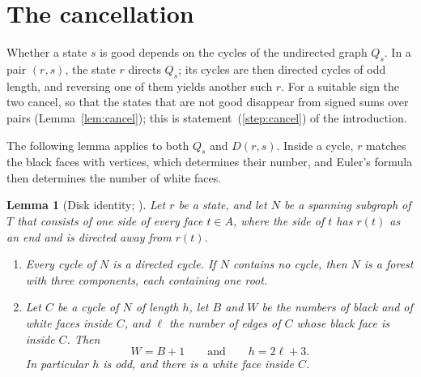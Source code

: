 \documentclass[a4paper]{amsart}
\numberwithin{equation}{section}
\newtheorem{lemma}[equation]{Lemma}
\theoremstyle{definition}
\begin{document}
\section{The cancellation}\label{sec:cancel}

Whether a state $s$ is good depends on the cycles of the undirected graph $Q_s$.
In a pair $(r,s)$, the state $r$ directs $Q_s$; its cycles are then directed cycles of odd length, and reversing one of them yields another such $r$.
For a suitable sign the two cancel, so that the states that are not good disappear from signed sums over pairs (Lemma~\ref{lem:cancel}); this is statement~(\ref{step:cancel}) of the introduction.

The following lemma applies to both $Q_s$ and $D(r,s)$.
Inside a cycle, $r$ matches the black faces with vertices, which determines their number, and Euler's formula then determines the number of white faces.

\begin{lemma}[Disk identity; {\cite[Lemma~4.1]{OpenAI}}]\label{lem:disk}
Let $r$ be a state, and let $N$ be a spanning subgraph of $T$ that consists of one side of every face $t\in A$, where the side of $t$ has $r(t)$ as an end and is directed away from $r(t)$.
\begin{enumerate}
\item Every cycle of $N$ is a directed cycle.
If $N$ contains no cycle, then $N$ is a forest with three components, each containing one root.
\item Let $C$ be a cycle of $N$ of length $h$, let $B$ and $W$ be the numbers of black and of white faces inside $C$, and $\ell$ the number of edges of $C$ whose black face is inside $C$.
Then
\begin{equation}\label{eq:disk}
W=B+1\qquad\text{and}\qquad h=2\ell+3 .
\end{equation}
In particular $h$ is odd, and there is a white face inside $C$.
\end{enumerate}
\end{lemma}
\end{document}
